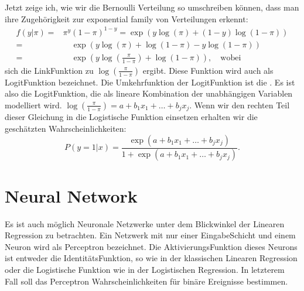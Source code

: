 \documentclass[letterpaper,10pt,english]{jupyterBook}
\begin{document}
\sphinxAtStartPar
Jetzt zeige ich, wie wir die Bernoulli Verteilung so umschreiben können, dass man ihre Zugehörigkeit zur exponential family von Verteilungen erkennt:
\begin{eqnarray*}
f(y |\pi) =& \pi^y (1-\pi)^{1-y} = \exp\left(y \log(\pi) + (1-y) \log(1-\pi)\right)\\
= & \quad \exp\left(y \log(\pi) + \log(1-\pi) - y\log(1-\pi)\right)\\
=&\quad \exp\left(y\log(\frac{\pi}{1-\pi}) + \log(1-\pi)\right),\quad\text{wobei}
\end{eqnarray*}
\sphinxAtStartPar
sich die Link\sphinxhyphen{}Funktion zu \(\log(\frac{\pi}{1-\pi})\) ergibt. Diese Funktion wird auch als Logit\sphinxhyphen{}Funktion bezeichnet. Die Umkehrfunktion der Logit\sphinxhyphen{}Funktion ist die . Es ist also die Logit\sphinxhyphen{}Funktion, die als lineare Kombination der unabhängigen Variablen modelliert wird.
\(\log(\frac{\pi}{1-\pi}) = a + b_{1}x_1 + \ldots + b_jx_j\). Wenn wir den rechten Teil dieser Gleichung in die Logistische Funktion einsetzen erhalten wir die geschätzten Wahrscheinlichkeiten:
\label{equation:Regression_Techniques:dae27466-6566-4874-bb3b-cdca3adf7841}\begin{equation}
P(y=1 |x) = \frac{\exp(a + b_{1}x_1 + \ldots + b_jx_j)}{1 + \exp(a + b_{1}x_1 + \ldots + b_jx_j)}.
\end{equation}

\chapter{Neural Network}
\label{\detokenize{Regression_Techniques:neural-network}}
\sphinxAtStartPar
Es ist auch möglich Neuronale Netzwerke unter dem Blickwinkel der Linearen Regression zu betrachten. Ein Netzwerk mit nur einer Eingabe\sphinxhyphen{}Schicht und einem Neuron wird als Perceptron bezeichnet. Die Aktivierungs\sphinxhyphen{}Funktion dieses Neurons ist entweder die Identitäts\sphinxhyphen{}Funktion, so wie in der klassischen Linearen Regression oder die Logistische Funktion wie in der Logistischen Regression. In letzterem Fall soll das Perceptron Wahrscheinlichkeiten für binäre Ereignisse bestimmen.

\noindent{}
\end{document}
